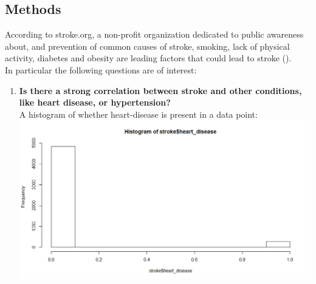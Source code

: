 \documentclass[boxes, qed]{homework}
\begin{document}
\subsection*{Methods}
According to stroke.org, a non-profit organization dedicated to public awareness about,
and prevention of common causes of stroke, smoking, lack of physical activity, diabetes and 
obesity are leading factors that could lead to stroke (\cite{strokeorg}).\\
In particular the following questions are of interest:
\begin{enumerate}
  \item \textbf{Is there a strong correlation between stroke and other conditions, like heart disease, or hypertension?}\\
  A histogram of whether heart-disease is present in a data point:\\
  \includegraphics[scale=.5]{stroke-heart}    
\end{enumerate}

\pagebreak
\printbibliography
\end{document}
